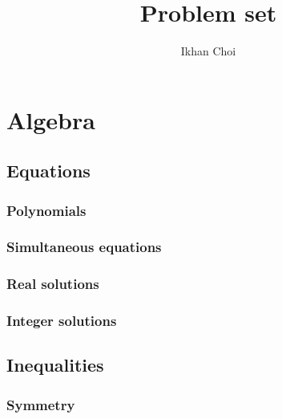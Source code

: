 \documentclass{../../large}
\begin{document}
\title{Problem set}
\author{Ikhan Choi}
\maketitle
\tableofcontents

\part{Algebra}
\chapter{Equations}
\section{Polynomials}
\section{Simultaneous equations}
\section{Real solutions}

\begin{prb}[Factorization]
\end{prb}
\begin{prb}[Discriminant]
\end{prb}
\begin{prb}
\end{prb}
\begin{prb}
\end{prb}

\section{Integer solutions}
\begin{prb}[Factorization]
\end{prb}
\begin{prb}
\end{prb}
\begin{prb}
\end{prb}


\chapter{Inequalities}
\section{Symmetry}
\end{document}
